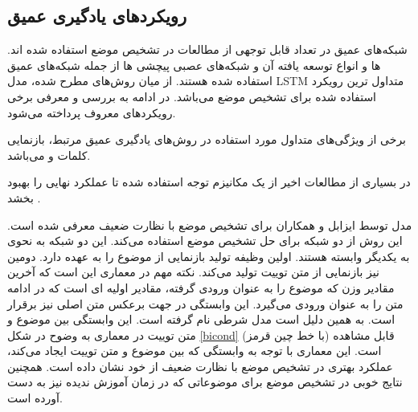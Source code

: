 \begin{table}[ht]
\begin{tabular}{c c  c c c}
		\hline
		\hline
		
		
	\end{tabular}
\end{table}

\subsection[رویکردهای یادگیری عمیق]{رویکردهای یادگیری عمیق
	}
	
	شبکه‌های عمیق در تعداد قابل توجهی از مطالعات در تشخیص موضع استفاده شدە اند.
	 	  ها و انواع توسعه یافته آن 
و شبکە‌های عصبی پیچشی
 ها از جمله شبکە‌های عمیق استفاده شده	هستند. از میان روش‌های مطرح شده، مدل LSTM متداول ترین رویکرد استفاده شده برای تشخیص موضع
	می‌باشد. در ادامه به بررسی و معرفی برخی رویکردهای معروف پرداخته می‌شود. 
	
	برخی از ویژگی‌های متداول مورد استفاده در روش‌های یادگیری عمیق مرتبط، بازنمایی کلمات
	و
	می‌باشد.
	
	در بسیاری از مطالعات اخیر از یک مکانیزم توجه استفاده شده تا عملکرد نهایی را بهبود بخشد
	\cite{10.1007/978-3-319-68783-4-2, 8489665}.
	
	مدل
	توسط ایزابل و همکاران
	\cite{augenstein-etal-2016-stance}
	برای تشخیص موضع با نظارت ضعیف معرفی شده است. این روش از دو شبکه 
	برای حل تشخیص موضع استفاده می‌کند. این دو شبکه به نحوی به یکدیگر وابسته هستند. اولین
	وظیفه تولید بازنمایی از موضوع را به عهده دارد. دومین
	  نیز بازنمایی از متن توییت تولید می‌کند. نکته مهم در معماری
این است که آخرین مقادیر وزن
که موضوع را به عنوان ورودی گرفته، مقادیر اولیه
ای است که در ادامه متن را به عنوان ورودی می‌گیرد. این وابستگی در
جهت برعکس متن اصلی نیز برقرار است. به همین دلیل است مدل شرطی نام گرفته است. این وابستگی بین موضوع و متن توییت در معماری به وضوح در شکل
\ref{bicond}
(با خط چین قرمز) قابل مشاهده است. این معماری با توجه به وابستگی که بین موضوع و متن توییت ایجاد می‌کند، عملکرد بهتری در تشخیص موضع
با نظارت ضعیف از خود نشان داده است. همچنین نتایج خوبی در تشخیص موضع برای موضوعاتی که در زمان آموزش ندیده نیز به دست آورده است.


